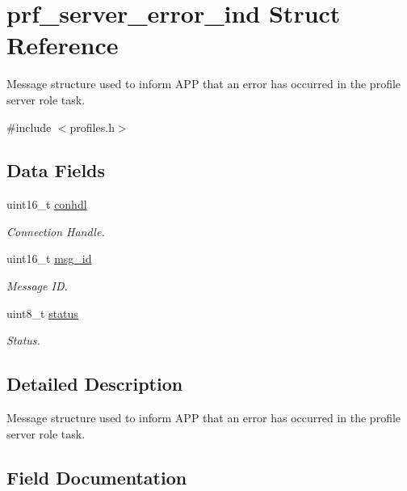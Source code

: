 \hypertarget{structprf__server__error__ind}{}\section{prf\+\_\+server\+\_\+error\+\_\+ind Struct Reference}
\label{structprf__server__error__ind}


Message structure used to inform A\+PP that an error has occurred in the profile server role task.  




{\ttfamily \#include $<$profiles.\+h$>$}

\subsection*{Data Fields}
\begin{DoxyCompactItemize}
\item 
uint16\+\_\+t \mbox{\hyperlink{structprf__server__error__ind_a0e06225279ecca6fb6e57fe77c344f27}{conhdl}}
\begin{DoxyCompactList}\small\item\em Connection Handle. \end{DoxyCompactList}\item 
uint16\+\_\+t \mbox{\hyperlink{structprf__server__error__ind_a689014fc11d4f26d264ddae2eaebc9d8}{msg\+\_\+id}}
\begin{DoxyCompactList}\small\item\em Message ID. \end{DoxyCompactList}\item 
uint8\+\_\+t \mbox{\hyperlink{structprf__server__error__ind_ade818037fd6c985038ff29656089758d}{status}}
\begin{DoxyCompactList}\small\item\em Status. \end{DoxyCompactList}\end{DoxyCompactItemize}


\subsection{Detailed Description}
Message structure used to inform A\+PP that an error has occurred in the profile server role task. 

\subsection{Field Documentation}
\mbox{\label{structprf__server__error__ind_a0e06225279ecca6fb6e57fe77c344f27}} 
